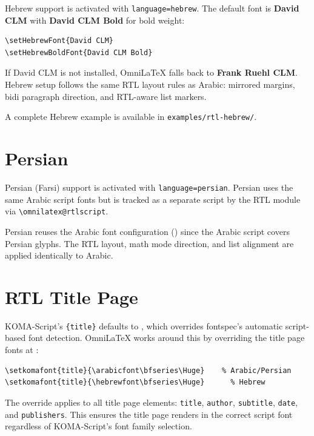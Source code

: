 Hebrew support is activated with \texttt{language=hebrew}.  The default
font is \textbf{David CLM} with \textbf{David CLM Bold} for bold weight:

\begin{verbatim}
\setHebrewFont{David CLM}
\setHebrewBoldFont{David CLM Bold}
\end{verbatim}

If David CLM is not installed, OmniLaTeX falls back to
\textbf{Frank Ruehl CLM}.  Hebrew setup follows the same RTL layout
rules as Arabic: mirrored margins, bidi paragraph direction, and
RTL-aware list markers.

A complete Hebrew example is available in \texttt{examples/rtl-hebrew/}.

\section{Persian}

Persian (Farsi) support is activated with \texttt{language=persian}.
Persian uses the same Arabic script fonts but is tracked as a separate
script by the RTL module via \texttt{\textbackslash omnilatex@rtlscript}.

Persian reuses the Arabic font configuration () since
the Arabic script covers Persian glyphs.  The RTL layout, math mode
direction, and list alignment are applied identically to Arabic.

\section{RTL Title Page}

KOMA-Script's \texttt{\{title\}} defaults to
, which overrides fontspec's automatic script-based font
detection.  OmniLaTeX works around this by overriding the title page
fonts at :

\begin{verbatim}
\setkomafont{title}{\arabicfont\bfseries\Huge}    % Arabic/Persian
\setkomafont{title}{\hebrewfont\bfseries\Huge}      % Hebrew
\end{verbatim}

The override applies to all title page elements: \texttt{title},
\texttt{author}, \texttt{subtitle}, \texttt{date}, and
\texttt{publishers}.  This ensures the title page renders in the correct
script font regardless of KOMA-Script's font family selection.

